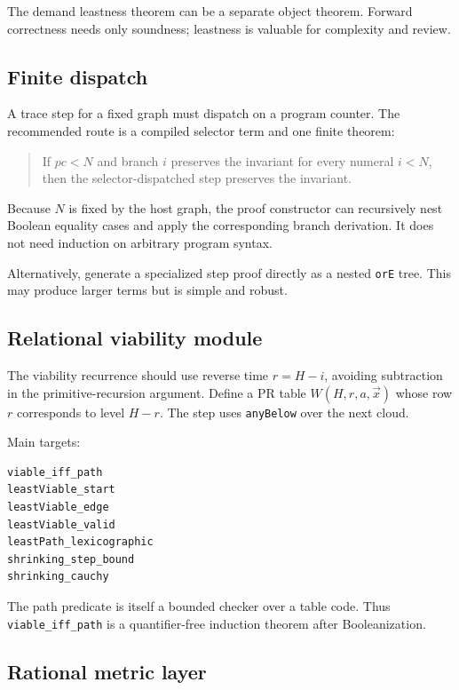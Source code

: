 The demand leastness theorem can be a separate object theorem.  Forward
correctness needs only soundness; leastness is valuable for complexity and
review.

\subsection{Finite dispatch}

A trace step for a fixed graph must dispatch on a program counter.  The
recommended route is a compiled selector term and one finite theorem:

\begin{quote}
If \(pc<N\) and branch \(i\) preserves the invariant for every numeral
\(i<N\), then the selector-dispatched step preserves the invariant.
\end{quote}

Because \(N\) is fixed by the host graph, the proof constructor can recursively
nest Boolean equality cases and apply the corresponding branch derivation.  It
does not need induction on arbitrary program syntax.

Alternatively, generate a specialized step proof directly as a nested
\texttt{orE} tree.  This may produce larger terms but is simple and robust.

\subsection{Relational viability module}

The viability recurrence should use reverse time \(r=H-i\), avoiding
subtraction in the primitive-recursion argument.  Define a PR table
\(W(H,r,a,\vec x)\) whose row \(r\) corresponds to level \(H-r\).  The step
uses \texttt{anyBelow} over the next cloud.

Main targets:

\begin{lstlisting}[language={}]
viable_iff_path
leastViable_start
leastViable_edge
leastViable_valid
leastPath_lexicographic
shrinking_step_bound
shrinking_cauchy
\end{lstlisting}

The path predicate is itself a bounded checker over a table code.  Thus
\texttt{viable\_iff\_path} is a quantifier-free induction theorem after
Booleanization.

\subsection{Rational metric layer}

